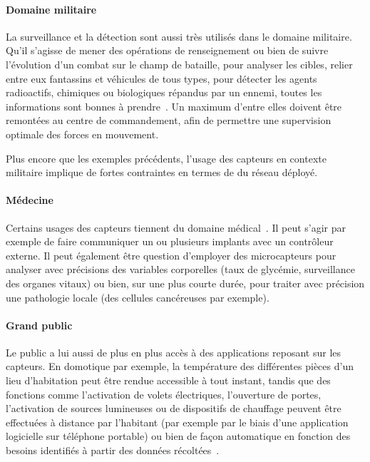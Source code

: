         \paragraph{Domaine militaire}
La surveillance et la détection sont aussi très utilisés dans le domaine militaire.
Qu'il s'agisse de mener des opérations de renseignement ou bien de suivre l'évolution d'un combat sur le champ de bataille, pour analyser les cibles, relier entre eux fantassins et véhicules de tous types, pour détecter les agents radioactifs, chimiques ou biologiques répandus par un ennemi, toutes les informations sont bonnes à prendre~\cite{ASSC02}.
Un maximum d'entre elles doivent être remontées au centre de commandement, afin de permettre une supervision optimale des forces en mouvement.

Plus encore que les exemples précédents, l'usage des capteurs en contexte militaire implique de fortes contraintes en termes de \secu du réseau déployé.

        \paragraph{Médecine}
Certains usages des capteurs tiennent du domaine médical~\cite{SZFDXC14}.
Il peut s'agir par exemple de faire communiquer un ou plusieurs implants avec un contrôleur externe.
Il peut également être question d'employer des microcapteurs pour analyser avec précisions des variables corporelles (taux de glycémie, surveillance des organes vitaux) ou bien, sur une plus courte durée, pour traiter avec précision une pathologie locale (des cellules cancéreuses par exemple).

        \paragraph{Grand public}
Le public a lui aussi de plus en plus accès à des applications reposant sur les capteurs.
En domotique par exemple, la température des différentes pièces d'un lieu d'habitation peut être rendue accessible à tout instant, tandis que des fonctions comme l'activation de volets électriques, l'ouverture de portes, l'activation de sources lumineuses ou de dispositifs de chauffage peuvent être effectuées à distance par l'habitant (par exemple par le biais d'une application logicielle sur téléphone portable) ou bien de façon automatique en fonction des besoins identifiés à partir des données récoltées~\cite{ASSC02}.

